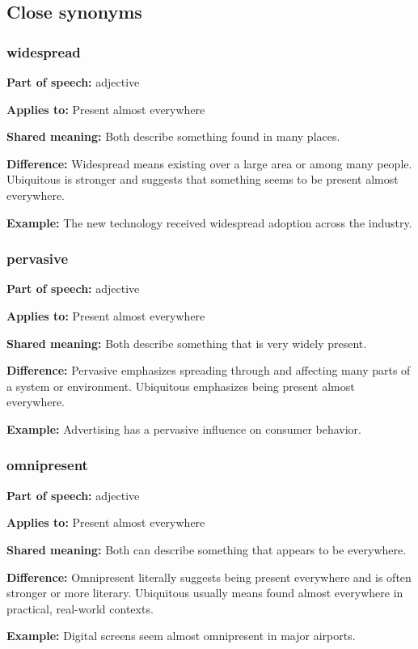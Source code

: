 \documentclass[11pt]{article}
\begin{document}
\subsection{Close synonyms}
\subsubsection{widespread}
\textbf{Part of speech:} adjective

\textbf{Applies to:} Present almost everywhere

\textbf{Shared meaning:} Both describe something found in many places.

\textbf{Difference:} Widespread means existing over a large area or among many people. Ubiquitous is stronger and suggests that something seems to be present almost everywhere.

\textbf{Example:} The new technology received widespread adoption across the industry.

\subsubsection{pervasive}
\textbf{Part of speech:} adjective

\textbf{Applies to:} Present almost everywhere

\textbf{Shared meaning:} Both describe something that is very widely present.

\textbf{Difference:} Pervasive emphasizes spreading through and affecting many parts of a system or environment. Ubiquitous emphasizes being present almost everywhere.

\textbf{Example:} Advertising has a pervasive influence on consumer behavior.

\subsubsection{omnipresent}
\textbf{Part of speech:} adjective

\textbf{Applies to:} Present almost everywhere

\textbf{Shared meaning:} Both can describe something that appears to be everywhere.

\textbf{Difference:} Omnipresent literally suggests being present everywhere and is often stronger or more literary. Ubiquitous usually means found almost everywhere in practical, real-world contexts.

\textbf{Example:} Digital screens seem almost omnipresent in major airports.
\end{document}
